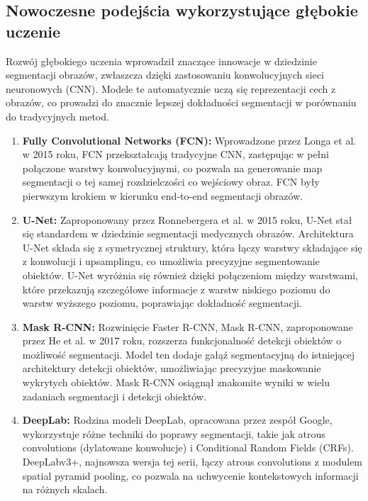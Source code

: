 \subsection*{Nowoczesne podejścia wykorzystujące głębokie uczenie}

Rozwój głębokiego uczenia wprowadził znaczące innowacje w dziedzinie segmentacji obrazów, 
zwłaszcza dzięki zastosowaniu konwolucyjnych sieci neuronowych (CNN). Modele te automatycznie 
uczą się reprezentacji cech z obrazów, co prowadzi do znacznie lepszej dokładności segmentacji w 
porównaniu do tradycyjnych metod.

\begin{enumerate}
    \item \textbf{Fully Convolutional Networks (FCN):} Wprowadzone przez Longa et al. w 2015 roku, 
    FCN przekształcają tradycyjne CNN, zastępując w pełni połączone warstwy konwolucyjnymi, co 
    pozwala na generowanie map segmentacji o tej samej rozdzielczości co wejściowy obraz. 
    FCN były pierwszym krokiem w kierunku end-to-end segmentacji obrazów.
    \item \textbf{U-Net:} Zaproponowany przez Ronnebergera et al. w 2015 roku, U-Net stał się 
    standardem w dziedzinie segmentacji medycznych obrazów. Architektura U-Net składa się z 
    symetrycznej struktury, która łączy warstwy składające się z konwolucji i upsamplingu, co 
    umożliwia precyzyjne segmentowanie obiektów. U-Net wyróżnia się również dzięki połączeniom 
    między warstwami, które przekazują szczegółowe informacje z warstw niskiego poziomu do warstw 
    wyższego poziomu, poprawiając dokładność segmentacji.
    \item \textbf{Mask R-CNN:} Rozwinięcie Faster R-CNN, Mask R-CNN, zaproponowane przez He et al. 
    w 2017 roku, rozszerza funkcjonalność detekcji obiektów o możliwość segmentacji. 
    Model ten dodaje gałąź segmentacyjną do istniejącej architektury detekcji obiektów, 
    umożliwiając precyzyjne maskowanie wykrytych obiektów. Mask R-CNN osiągnął znakomite 
    wyniki w wielu zadaniach segmentacji i detekcji obiektów.
    \item \textbf{DeepLab:} Rodzina modeli DeepLab, opracowana przez zespół Google, wykorzystuje 
    różne techniki do poprawy segmentacji, takie jak atrous convolutions (dylatowane konwolucje) i 
    Conditional Random Fields (CRFs). DeepLabv3+, najnowsza wersja tej serii, łączy atrous 
    convolutions z modulem spatial pyramid pooling, co pozwala na uchwycenie kontekstowych 
    informacji na różnych skalach.
\end{enumerate}

